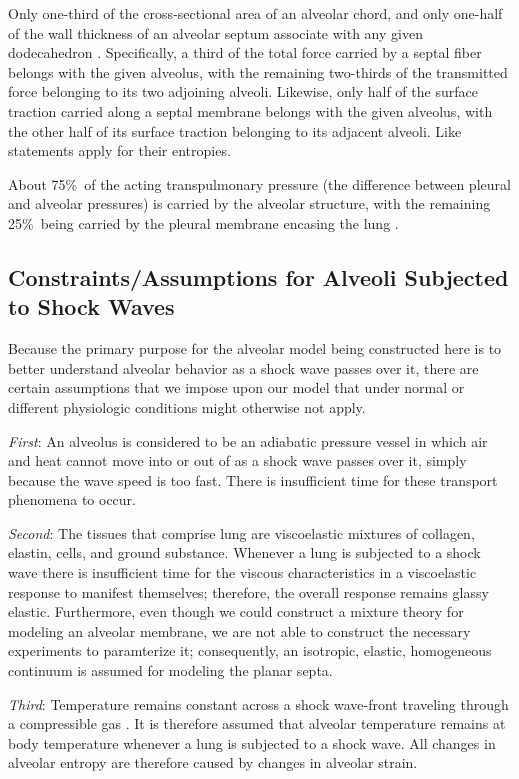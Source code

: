 Only one-third of the cross-sectional area of an alveolar chord, and only one-half of the wall thickness of an alveolar septum associate with any given dodecahedron \cite{Kimmeletal87}.  Specifically, a third of the total force carried by a septal fiber belongs with the  given alveolus, with the remaining two-thirds of the transmitted force belonging to its two adjoining alveoli.  Likewise, only half of the surface traction carried along a septal membrane belongs with the given alveolus, with the other half of its surface traction belonging to its adjacent alveoli.  Like statements apply for their entropies.

About 75\%\ of the acting transpulmonary pressure (the difference between pleural and alveolar pressures) is carried by the alveolar structure, with the remaining 25\%\ being carried by the pleural membrane encasing the lung \cite{Hajjietal79}.

\subsection{Constraints\slash Assumptions for Alveoli Subjected to Shock Waves}

Because the primary purpose for the alveolar model being constructed here is to better understand alveolar behavior as a shock wave passes over it, there are certain assumptions that we impose upon our model that under normal or different physiologic conditions might otherwise not apply.  

\textit{First\/}: An alveolus is considered to be an adiabatic pressure vessel in which air and heat cannot move into or out of as a shock wave passes over it, simply because the wave speed is too fast.  There is insufficient time for these transport phenomena to occur.

\textit{Second\/}: The tissues that comprise lung are visco\-elastic \cite{Hildebrandt69,HoppinHildebrandt77} mixtures of collagen, elastin, cells, and ground substance. \cite{RoanWaters11,Sukietal11}  Whenever a lung is subjected to a shock wave there is insufficient time for the viscous characteristics in a visco\-elastic response to manifest themselves; therefore, the overall response remains glassy elastic.  Furthermore, even though we could construct a mixture theory for modeling an alveolar membrane, we are not able to construct the necessary experiments to paramterize it; consequently, an isotropic, elastic, homogeneous continuum is assumed for modeling the planar septa.

\textit{Third\/}: Temperature remains constant across a shock wave-front traveling through a compressible gas \cite{AmesStaff53}.  It is therefore assumed that alveolar temperature remains at body temperature whenever a lung is subjected to a shock wave.  All changes in alveolar entropy are therefore caused by changes in alveolar strain.

